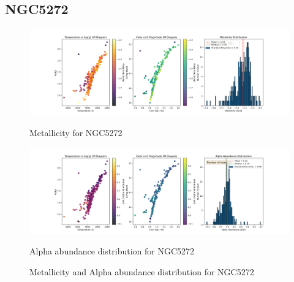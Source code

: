 \documentclass[a4paper,12pt]{article}
\begin{document}
\subsection{NGC5272}
\begin{figure}[H]
    \centering
    \begin{minipage}[b]{0.8\textwidth}
        \centering
        \includegraphics[width=\textwidth]{NGC5272_metalicity.png}
        \caption{Metallicity for NGC5272}
        \label{fig:NGC5272_metalicity}
    \end{minipage}
    \hfill
    \begin{minipage}[b]{0.8\textwidth}
        \centering
        \includegraphics[width=\textwidth]{NGC5272_alpha.png}
        \caption{Alpha abundance distribution for NGC5272}
        \label{fig:NGC5272_alpha}
    \end{minipage}
    \caption{Metallicity and Alpha abundance distribution for NGC5272}
    \label{fig:NGC5272_combined}
\end{figure}
\clearpage
\end{document}
